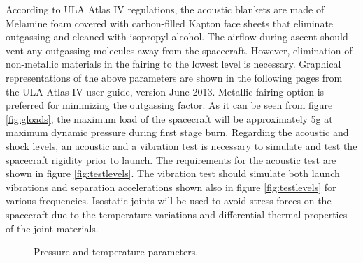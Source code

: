 According to ULA Atlas IV regulations, the acoustic blankets are made of Melamine foam covered with carbon-filled Kapton face sheets that eliminate outgassing and cleaned with isopropyl alcohol. The airflow during ascent should vent any outgassing molecules away from the spacecraft. However, elimination of non-metallic materials in the fairing to the lowest level is necessary. Graphical representations of the above parameters are shown in the following pages from the ULA Atlas IV user guide, version June 2013. Metallic fairing option is preferred for minimizing the outgassing factor. As it can be seen from figure \ref{fig:gloads}, the maximum load of the spacecraft will be approximately 5g at maximum dynamic pressure during first stage burn. Regarding the acoustic and shock levels, an acoustic and a vibration test is necessary to simulate and test the spacecraft rigidity prior to launch. The requirements for the acoustic test are shown in figure \ref{fig:testlevels}. The vibration test should simulate both launch vibrations and separation accelerations shown also in figure \ref{fig:testlevels} for various frequencies. Isostatic joints will be used to avoid stress forces on the spacecraft due to the temperature variations and differential thermal properties of the joint materials. 
\begin{figure}[htb]
    \centering
    \captionsetup[subfigure]{width=0.45\textwidth}
    \caption{Pressure and temperature parameters.}\label{fig:press_temp}
\end{figure}

